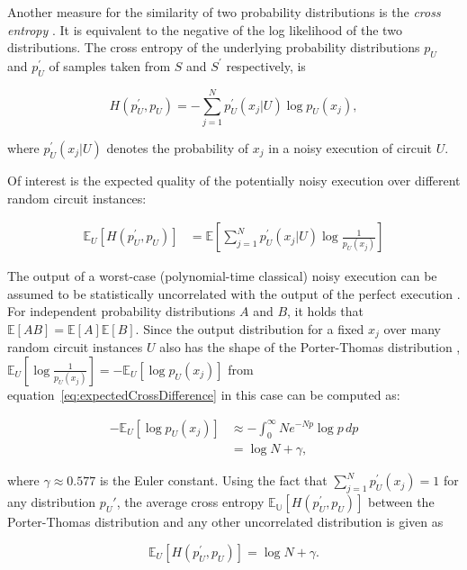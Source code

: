 Another measure for the similarity of two probability distributions is the \textit{cross entropy} \cite{kullback1951}.
It is equivalent to the negative of the log likelihood of the two distributions.
The cross entropy of the underlying
probability distributions $p_U$ and $p_U^{\prime}$ of samples taken from $S$ and $S^{\prime}$ respectively, is

\begin{equation}
  H(p_U^{\prime},p_U) = - \sum_{j=1}^Np_U^{\prime}(x_j|U) \log{p_U(x_j)},
\end{equation}

where $p_U^{\prime}(x_j|U)$ denotes the probability of $x_j$ in a noisy execution of circuit $U$.

Of interest is the expected quality of the potentially noisy execution over
different random circuit instances:

\begin{align}
  \label{eq:expectedCrossDifference}
  \mathbb{E}_U[H(p_U^{\prime},p_U)] &= \mathbb{E} \left[\sum_{j=1}^Np_U^{\prime}(x_j|U)\log{\frac{1}{p_U(x_j)}}\right]
\end{align}

The output of a worst-case (polynomial-time classical) noisy execution can be assumed to
be statistically uncorrelated with the output of the perfect execution \cite{Boixo2018supremacy}. 
For independent probability distributions $A$ and $B$, it holds that $\mathbb{E}[AB] = \mathbb{E}[A] \mathbb{E}[B]$. 
Since the output distribution for a fixed $x_j$ over many random circuit
instances $U$ also has the shape of the Porter-Thomas distribution \cite{harrow2008random},
$\mathbb{E}_U[\log{\frac{1}{p_U(x_j)}}] = -\mathbb{E}_U[\log{p_U(x_j)}]$ from equation~\ref{eq:expectedCrossDifference} 
in this case can be computed as:

\begin{align}
  -\mathbb{E}_U[\log{p_U(x_j)}] &\approx - \int_0^{\infty}Ne^{-Np}\log{p} \,dp \\
                                &= \log{N} + \gamma,
\end{align}

where $\gamma \approx 0.577$ is the Euler constant.
Using the fact that $\sum_{j=1}^Np_U^{\prime}(x_j) = 1$ for any distribution $p_U{\prime}$, the average cross
entropy $\mathbb{E_U}[H(p_U^{\prime},p_U)]$ between the Porter-Thomas distribution and any other uncorrelated distribution is
given as 

\begin{equation}
  \mathbb{E}_U [H(p_U^{\prime},p_U)] = \log{N} + \gamma.
\end{equation}

